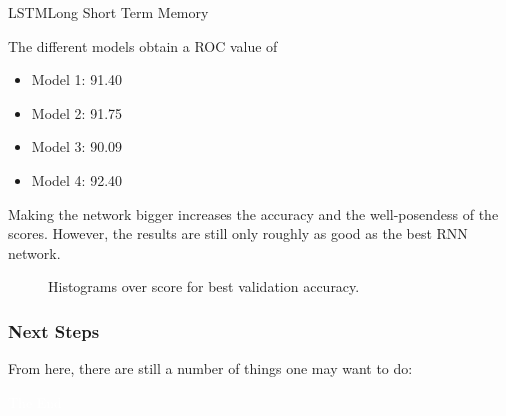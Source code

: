 \documentclass{beamer}
\newlength\figureheight
\newlength\figurewidth
\begin{document}
\begin{frame}{LSTM}{Long Short Term Memory}
	\noindent
\begin{minipage}{0.45\textwidth}%
	The different models obtain a ROC value of 
	\begin{itemize}%
		\item Model 1: 91.40
		\item Model 2: 91.75
		\item Model 3: 90.09
		\item Model 4: 92.40
	\end{itemize}
	Making the network bigger increases the accuracy and the well-posendess of the scores. However, the results are still only roughly as good as the best RNN network. 
\end{minipage} \hfill
\begin{minipage}{0.45\textwidth}%
	\begin{figure}
		\centering
		
		\setlength\figureheight{3cm}
		\setlength{}
		
		
		\caption{Histograms over score for best validation accuracy.} 
	\end{figure}
\end{minipage}
\end{frame}




\begin{frame}
  \frametitle{Next Steps}
  From here, there are still a number of things one may want to do:
\end{frame}

\bgroup
{}
\begin{frame}[t,plain]{}{}
  \begin{center}
    {\tiny \textcolor{white}{The End}}
  \end{center}
\end{frame}
\egroup
\end{document}
